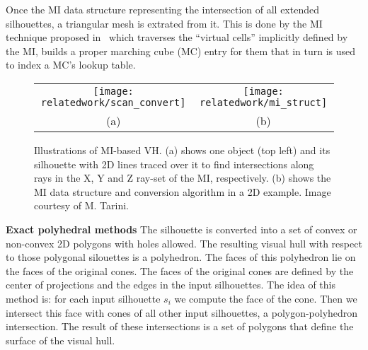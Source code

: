 Once the MI data structure representing the intersection of all extended silhouettes, a triangular mesh is extrated from it. This is done by the MI technique proposed in~\cite{rocchini2001marching} which traverses the ``virtual cells'' implicitly defined by the MI, builds a proper marching cube (MC) entry for them that in turn is used to index a MC's lookup table.
\begin{figure}[h]
\centering
\begin{tabular}{cc}
\texttt{[image: relatedwork/scan\_convert]}&
\texttt{[image: relatedwork/mi\_struct]}\\
(a) & (b)\\
\end{tabular}
\caption{Illustrations of MI-based VH. (a) shows one object (top left) and its silhouette with 2D lines traced over it to find intersections along rays in the X, Y and Z ray-set of the MI, respectively. (b) shows the MI data structure and conversion algorithm in a 2D example. Image courtesy of M. Tarini.}
\label{fig:robust_pc}
\end{figure}

\textbf{Exact polyhedral methods} 
The silhouette is converted into a set of convex or non-convex 2D polygons with holes allowed. The resulting visual hull with respect to those polygonal silouettes is a polyhedron. The faces of this polyhedron lie on the faces of the original cones. The faces of the original cones are defined by the center of projections and the edges in the input silhouettes. The idea of this method is: for each input silhouette $s_i$ we compute the face of the cone. Then we intersect this face with cones of all other input silhouettes, \ie a polygon-polyhedron intersection. The result of these intersections is a set of polygons that define the surface of the visual hull.



